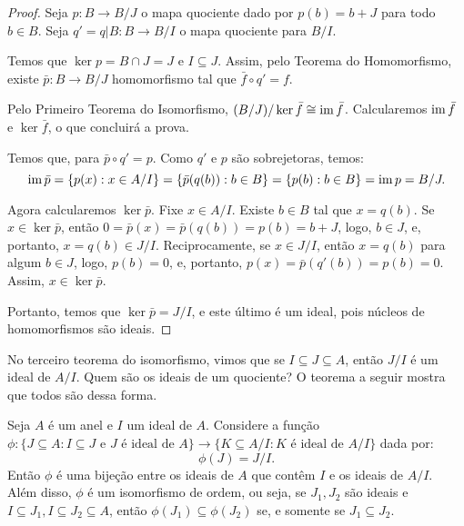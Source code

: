 \begin{proof}
    Seja $p:B\rightarrow B/J$ o mapa quociente dado por $p(b)=b+J$ para todo $b \in B$.
    Seja $q'=q|B:B\rightarrow B/I$ o mapa quociente para $B/I$.

    Temos que $\ker p=B\cap J=J$ e $I\subseteq J$.
    Assim, pelo Teorema do Homomorfismo, existe $\bar p:B\rightarrow B/J$ homomorfismo tal que $\bar f\circ q'=f$.
    \begin{figure}[H]\centering
    \end{figure}
    Pelo Primeiro Teorema do Isomorfismo, $(B/J)/\ker \bar f\cong \operatorname{im} \bar f$.
    Calcularemos $\operatorname{im} \bar f$ e $\ker \bar f$, o que concluirá a prova.

    Temos que, para $\bar p\circ q'=p$.
    Como $q'$ e $p$ são sobrejetoras, temos:
    \[\operatorname{im} \bar p=\{p(x): x \in A/I\}=\{\bar p(q(b)):b \in B\}=\{p(b):b \in B\}=\operatorname{im} p=B/J.\]

    Agora calcularemos $\ker \bar p$.
    Fixe $x \in A/I$.
    Existe $b \in B$ tal que $x=q(b)$.
    Se $x \in \ker \bar p$, então $0=\bar p(x)=\bar p(q(b))=p(b)=b+J$, logo, $b \in J$, e, portanto, $x=q(b)\in J/I$.
    Reciprocamente, se $x \in J/I$, então $x=q(b)$ para algum $b \in J$, logo, $p(b)=0$, e, portanto, $p(x)=\bar p(q'(b))=p(b)=0$.
    Assim, $x \in \ker \bar p$.

    Portanto, temos que $\ker \bar p=J/I$, e este último é um ideal, pois núcleos de homomorfismos são ideais.
\end{proof}

No terceiro teorema do isomorfismo, vimos que se $I\subseteq J\subseteq A$, então $J/I$ é um ideal de $A/I$.
Quem são os ideais de um quociente?
O teorema a seguir mostra que todos são dessa forma.

\begin{theorem}
    Seja $A$ é um anel e $I$ um ideal de $A$.
    Considere a função $\phi:\{J\subseteq A: I\subseteq J \text{ e } J \text{ é ideal de } A\}\rightarrow \{K\subseteq A/I: K \text{ é ideal de } A/I\}$ dada por:
    \[\phi(J)=J/I.\]
    Então $\phi$ é uma bijeção entre os ideais de $A$ que contêm $I$ e os ideais de $A/I$.
    Além disso, $\phi$ é um isomorfismo de ordem, ou seja, se $J_1, J_2$ são ideais e $I\subseteq J_1, I\subseteq J_2\subseteq A$, então $\phi(J_1)\subseteq \phi(J_2)$ se, e somente se $J_1\subseteq J_2$.
\end{theorem}

